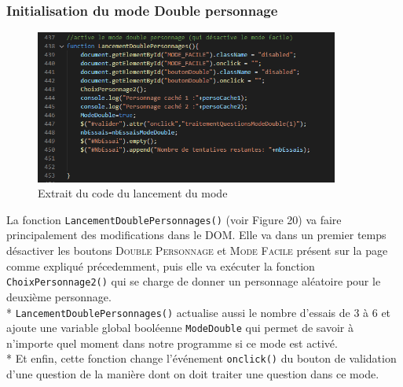 \documentclass{article}
\begin{document}
            \subsubsection{Initialisation du mode \textsf{Double personnage}}
                \begin{figure}[h]
                    \centering \includegraphics[width=10cm]{images/LancementDoublePersonnage.png}
                    \caption{Extrait du code du lancement du mode}
                \end{figure}
                La fonction \texttt{LancementDoublePersonnages()} (voir Figure 20) va faire principalement des modifications dans le DOM. Elle va dans un premier temps désactiver les boutons \textsc{Double Personnage} et \textsc{Mode Facile} présent sur la page comme expliqué précedemment, puis elle va exécuter la fonction \texttt{ChoixPersonnage2()} qui se charge de donner un personnage aléatoire pour le deuxième personnage.\\*
                \texttt{LancementDoublePersonnages()} actualise aussi le nombre d'essais de 3 à 6 et ajoute une variable global booléenne \texttt{ModeDouble} qui permet de savoir à n'importe quel moment dans notre programme si ce mode est activé.\\*
                Et enfin, cette fonction change l'événement \texttt{onclick()} du bouton de validation d'une question de la manière dont on doit traiter une question dans ce mode.
                
\end{document}
